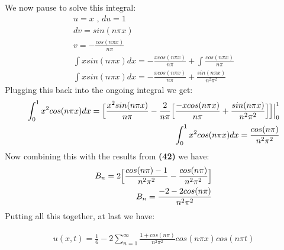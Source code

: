 \documentclass{article}
\begin{document}
We now pause to solve this integral:
\begin{equation}
\begin{aligned}
u = x \text{ , } du = 1\\
dv = sin(n\pi x)\\
v = -\frac{cos(n\pi x)}{n\pi}\\
\int xsin(n\pi x)dx = -\frac{xcos(n\pi x)}{n\pi} + \int \frac{cos(n\pi x)}{n\pi}\\
\int xsin(n\pi x)dx =  -\frac{xcos(n\pi x)}{n\pi} + \frac{sin(n\pi x)}{n^2\pi^2}
\end{aligned}
\end{equation}
Plugging this back into the ongoing integral we get:
\begin{equation}
\begin{aligned}
\int_0^1x^2cos(n\pi x)dx = \Big{[}\frac{x^2sin(n\pi x)}{n\pi} - \frac{2}{n\pi}\Big{[}\frac{-xcos(n\pi x)}{n\pi} + \frac{sin(n\pi x)}{n^2\pi^2} \Big{]}\Big{]}\Big{|}_0^1\\
\int_0^1x^2cos(n\pi x)dx = \frac{cos(n\pi)}{n^2\pi^2}
\end{aligned}
\end{equation}
Now combining this with the results from \textbf{(42)} we have:
\begin{equation}
\begin{aligned}
B_n = 2 \Big{[}\frac{cos(n\pi) - 1}{n^2\pi^2} - \frac{cos(n\pi)}{n^2\pi^2}\Big{]}\\
B_n = \frac{-2 -2cos(n\pi)}{n^2\pi^2}
\end{aligned}
\end{equation}
Putting all this together, at last we have:
\begin{tcolorbox}[minipage,colback=white,arc=0pt,outer arc=0pt]
\begin{equation}
\begin{aligned}
u(x,t)=\frac{1}{6} - 2\sum_{n=1}^{\infty}\frac{1 +cos(n\pi)}{n^2\pi^2}cos(n\pi x)cos(n\pi t)
\end{aligned}
\end{equation}
\end{tcolorbox}
\end{document}
